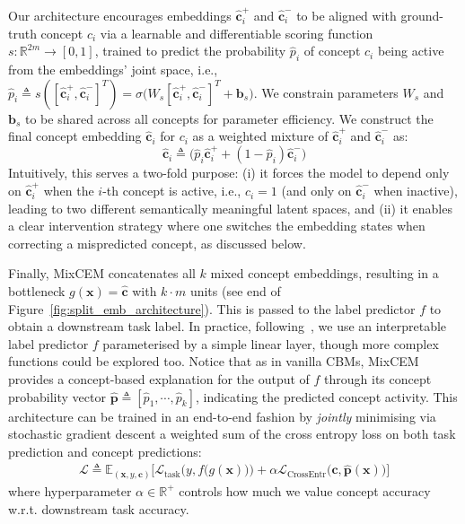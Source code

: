 \documentclass[withindex,glossary]{cam-thesis}
\theoremstyle{plain}
\theoremstyle{definition}
\theoremstyle{remark}
\begin{document}
Our architecture encourages embeddings $\hat{\mathbf{c}}^+_i$ and $\hat{\mathbf{c}}^-_i$ to be aligned with ground-truth concept $c_i$ via a learnable and differentiable scoring function $s: \mathbb{R}^{2 m} \rightarrow [0, 1]$, trained to predict the probability $\hat{p}_i$ of concept $c_i$ being active from the embeddings' joint space, i.e., $\hat{p}_i \triangleq s([\hat{\mathbf{c}}^+_i, \hat{\mathbf{c}}^-_i]^T) =  \sigma\big(W_s[\hat{\mathbf{c}}^+_i, \hat{\mathbf{c}}^-_i]^T + \mathbf{b}_s\big)$. We constrain parameters $W_s$ and $\mathbf{b}_s$ to be shared across all concepts for parameter efficiency.
We construct the final concept embedding $\hat{\mathbf{c}}_i$ for $c_i$ as a weighted mixture of $\hat{\mathbf{c}}^+_i$ and $\hat{\mathbf{c}}^-_i$ as:
\[
\hat{\mathbf{c}}_i \triangleq \big(\hat{p}_i \hat{\mathbf{c}}^+_i + (1 - \hat{p}_i) \hat{\mathbf{c}}^-_i \big)
\]
Intuitively, this serves a two-fold purpose: (i) it forces the model to depend only on $\hat{\mathbf{c}}^+_i$ when the $i$-th concept is active, i.e., $c_i = 1$ (and only on $\hat{\mathbf{c}}^-_i$ when inactive), leading to two different semantically meaningful latent spaces, and (ii) it enables a clear intervention strategy where one switches the embedding states when correcting a mispredicted concept, as discussed below.

Finally, MixCEM concatenates all $k$ mixed concept embeddings, resulting in a bottleneck $g(\mathbf{x}) = \hat{\textbf{c}}$ with $k\cdot m$ units (see end of Figure~\ref{fig:split_emb_architecture}). This is passed to the label predictor $f$ to obtain a downstream task label. In practice, following~\citet{koh2020concept}, we use an interpretable label predictor $f$ parameterised by a simple linear layer, though more complex functions could be explored too. Notice that as in vanilla CBMs, MixCEM provides a concept-based explanation for the output of $f$ through its concept probability vector $\hat{\mathbf{p}} \triangleq [\hat{p}_1, \cdots, \hat{p}_k ]$, indicating the predicted concept activity. This architecture can be trained in an end-to-end fashion by \textit{jointly} minimising via stochastic gradient descent a weighted sum of the cross entropy loss on both task prediction and concept predictions:
\begin{align}
    \mathcal{L} \triangleq \mathbb{E}_{(\mathbf{x}, y, \mathbf{c})}\Big[ \mathcal{L}_\text{task}\Big(y, f\big(g(\mathbf{x})\big)\Big) + \alpha \mathcal{L}_\text{CrossEntr}\Big(\mathbf{c}, \hat{\mathbf{p}}(\mathbf{x})\Big) \Big]
\end{align}
where hyperparameter $\alpha \in \mathbb{R}^+$ controls how much we value concept accuracy w.r.t. downstream task accuracy. 
\end{document}
